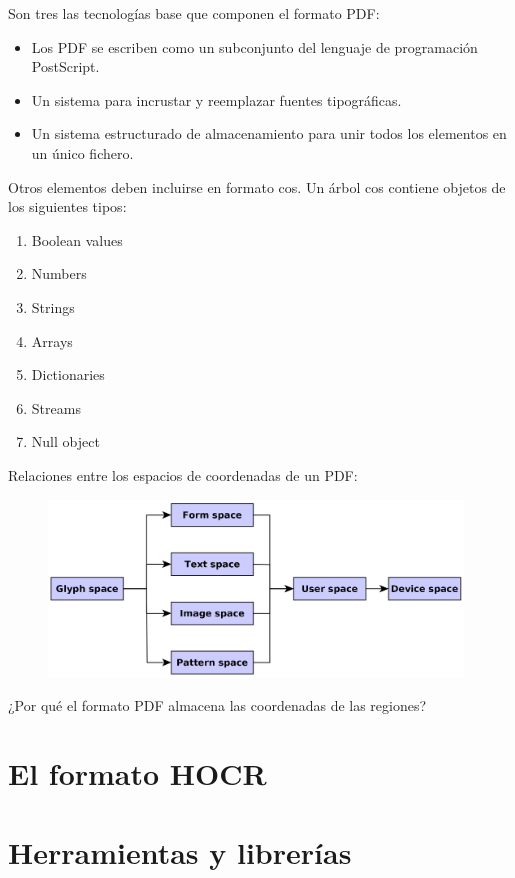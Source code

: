 Son tres las tecnologías base que componen el formato PDF:

\begin{itemize}
    \item Los PDF se escriben como un subconjunto del lenguaje de programación PostScript.
    \item Un sistema para incrustar y reemplazar fuentes tipográficas.
    \item Un sistema estructurado de almacenamiento para unir todos los elementos en un único fichero.
\end{itemize}

Otros elementos deben incluirse en formato \acrfull{cos}. Un árbol cos contiene objetos de los siguientes tipos:

\begin{enumerate}
    \item Boolean values
    \item Numbers
    \item Strings
    \item Arrays
    \item Dictionaries
    \item Streams
    \item Null object
\end{enumerate}

Relaciones entre los espacios de coordenadas de un PDF:

\begin{figure}[hp!]
  \centering
  \includegraphics[width=11cm]{imaxes/espacios-coordenadas.png}
\end{figure}

¿Por qué el formato PDF almacena las coordenadas de las regiones?

\section{El formato HOCR}
\section{Herramientas y librerías}

